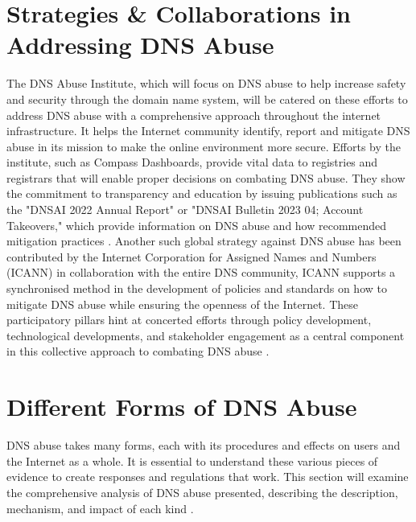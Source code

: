 \section{Strategies \& Collaborations in Addressing DNS Abuse}

The DNS Abuse Institute, which will focus on DNS abuse to help increase safety and security through the domain name system, will be catered on these efforts to address DNS abuse with a comprehensive approach throughout the internet infrastructure. It helps the Internet community identify, report and mitigate DNS abuse in its mission to make the online environment more secure. Efforts by the institute, such as Compass Dashboards, provide vital data to registries and registrars that will enable proper decisions on combating DNS abuse. They show the commitment to transparency and education by issuing publications such as the "DNSAI 2022 Annual Report" or "DNSAI Bulletin 2023 04; Account Takeovers," which provide information on DNS abuse and how recommended mitigation practices \cite{dnsabuseinstitute2023}. Another such global strategy against DNS abuse has been contributed by the Internet Corporation for Assigned Names and Numbers (ICANN)\cite{icann2022dnsabuse} in collaboration with the entire DNS community, ICANN supports a synchronised method in the development of policies and standards on how to mitigate DNS abuse while ensuring the openness of the Internet. These participatory pillars hint at concerted efforts through policy development, technological developments, and stakeholder engagement as a central component in this collective approach to combating DNS abuse \cite{dnsai2022report}. 



\section{Different Forms of DNS Abuse}

DNS abuse takes many forms, each with its procedures and effects on users and the Internet as a whole. It is essential to understand these various pieces of evidence to create responses and regulations that work. This section will examine the comprehensive analysis of DNS abuse presented, describing the description, mechanism, and impact of each kind \cite{dotmagazine2022dnsabuse}.

